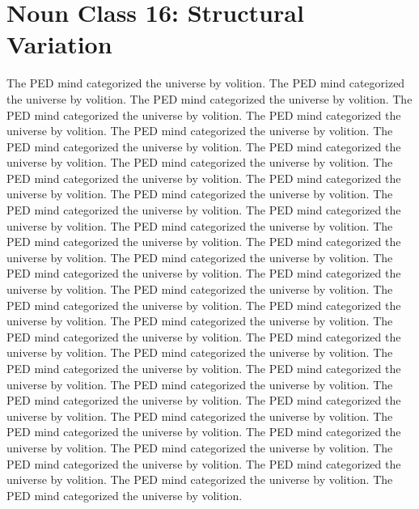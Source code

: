 \section{Noun Class 16: Structural Variation}
The PED mind categorized the universe by volition. The PED mind categorized the universe by volition. The PED mind categorized the universe by volition. The PED mind categorized the universe by volition. The PED mind categorized the universe by volition. The PED mind categorized the universe by volition. The PED mind categorized the universe by volition. The PED mind categorized the universe by volition. The PED mind categorized the universe by volition. The PED mind categorized the universe by volition. The PED mind categorized the universe by volition. The PED mind categorized the universe by volition. The PED mind categorized the universe by volition. The PED mind categorized the universe by volition. The PED mind categorized the universe by volition. The PED mind categorized the universe by volition. The PED mind categorized the universe by volition. The PED mind categorized the universe by volition. The PED mind categorized the universe by volition. The PED mind categorized the universe by volition. The PED mind categorized the universe by volition. The PED mind categorized the universe by volition. The PED mind categorized the universe by volition. The PED mind categorized the universe by volition. The PED mind categorized the universe by volition. The PED mind categorized the universe by volition. The PED mind categorized the universe by volition. The PED mind categorized the universe by volition. The PED mind categorized the universe by volition. The PED mind categorized the universe by volition. The PED mind categorized the universe by volition. The PED mind categorized the universe by volition. The PED mind categorized the universe by volition. The PED mind categorized the universe by volition. The PED mind categorized the universe by volition. The PED mind categorized the universe by volition. The PED mind categorized the universe by volition. The PED mind categorized the universe by volition. The PED mind categorized the universe by volition. The PED mind categorized the universe by volition. 

